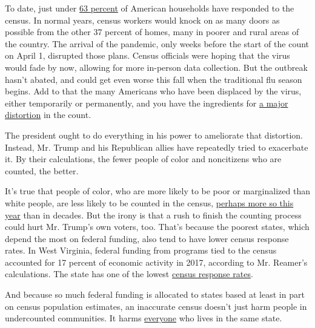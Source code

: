 To date, just under
\href{https://www.census.gov/newsroom/press-releases/2020/delivering-complete-accurate-count.html}{63
percent} of American households have responded to the census. In normal
years, census workers would knock on as many doors as possible from the
other 37 percent of homes, many in poorer and rural areas of the
country. The arrival of the pandemic, only weeks before the start of the
count on April 1, disrupted those plans. Census officials were hoping
that the virus would fade by now, allowing for more in-person data
collection. But the outbreak hasn't abated, and could get even worse
this fall when the traditional flu season begins. Add to that the many
Americans who have been displaced by the virus, either temporarily or
permanently, and you have the ingredients for
\href{https://www.censushardtocountmaps2020.us/?latlng=40.00000\%2C-98.09000\&z=4\&promotedfeaturetype=states\&baselayerstate=3\&rtrYear=sR2020latest\&infotab=info-rtrselfresponse\&filterQuery=false}{a
major distortion} in the count.

The president ought to do everything in his power to ameliorate that
distortion. Instead, Mr. Trump and his Republican allies have repeatedly
tried to exacerbate it. By their calculations, the fewer people of color
and noncitizens who are counted, the better.

It's true that people of color, who are more likely to be poor or
marginalized than white people, are less likely to be counted in the
census,
\href{https://www.npr.org/2019/06/04/728034176/2020-census-could-lead-to-worst-undercount-of-black-latinx-people-in-30-years\#:~:text=The\%20nonpartisan\%20think\%20tank\%20found,in\%20the\%20U.S.\%20since\%201990}{perhaps
more so this year} than in decades. But the irony is that a rush to
finish the counting process could hurt Mr. Trump's own voters, too.
That's because the poorest states, which depend the most on federal
funding, also tend to have lower census response rates. In West
Virginia, federal funding from programs tied to the census accounted for
17 percent of economic activity in 2017, according to Mr. Reamer's
calculations. The state has one of the lowest
\href{https://2020census.gov/en/response-rates.html}{census response
rates}.

And because so much federal funding is allocated to states based at
least in part on census population estimates, an inaccurate census
doesn't just harm people in undercounted communities. It harms
\href{https://www.nytimes.com/2018/04/03/opinion/trump-census-citizenship-question.html}{everyone}
who lives in the same state.

